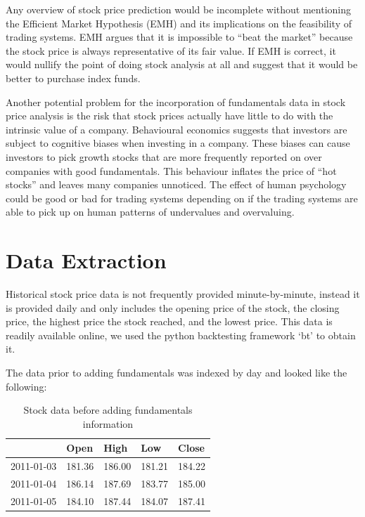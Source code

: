 \documentclass{article}
\begin{document}
Any overview of stock price prediction would be incomplete without mentioning the Efficient Market Hypothesis (EMH)\cite{malkiel_2003} and its implications on the feasibility of trading systems. EMH argues that it is impossible to “beat the market” because the stock price is always representative of its fair value. If EMH is correct, it would nullify the point of doing stock analysis at all and suggest that it would be better to purchase index funds. 

Another potential problem for the incorporation of fundamentals data in stock price analysis is the risk that stock prices actually have little to do with the intrinsic value of a company. Behavioural economics suggests that investors are subject to  cognitive biases when investing in a company. These biases can cause investors to pick growth stocks that are more frequently reported on over companies with good fundamentals. This behaviour inflates the price of “hot stocks” and leaves many companies unnoticed. The effect of human psychology could be good or bad for trading systems depending on if the trading systems are able to pick up on human patterns of undervalues and overvaluing. 

\section{Data Extraction}
\label{sec:data_extraction}

Historical stock price data is not frequently provided minute-by-minute, instead it is provided daily and only includes the opening price of the stock, the closing price, the highest price the stock reached, and the lowest price. This data is readily available online, we used the python backtesting framework ‘bt’ to obtain it. 

The data prior to adding fundamentals was indexed by day and looked like the following:
\begin{table}[H]
\centering
\begin{tabular}{|l|l|l|l|l|}
\hline
 & Open & High & Low & Close \\ \hline
2011-01-03 & 181.36 & 186.00 & 181.21 & 184.22\\ \hline
2011-01-04 & 186.14 & 187.69 & 183.77 & 185.00 \\ \hline
2011-01-05 & 184.10 & 187.44 & 184.07 & 187.41\\ \hline
\end{tabular}
\caption{Stock data before adding fundamentals information}
\label{my-label}
\end{table}
\end{document}
